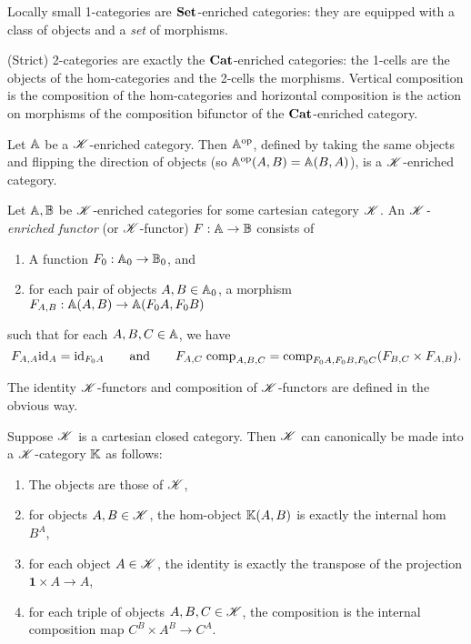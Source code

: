 \documentclass[../thesis.tex]{subfiles}
\begin{document}
\begin{example}
  Locally small 1-categories are ${\mathbf{Set}}$-enriched categories: they are equipped with a class of objects and a \emph{set} of
  morphisms.
\end{example}

\begin{example}[2-categories]\label{ex:2-cat}
  (Strict) 2-categories are exactly the ${\mathbf{Cat}}$-enriched categories: the 1-cells are the objects of the hom-categories and
  the 2-cells the morphisms. Vertical composition is the composition of the hom-categories and horizontal composition is
  the action on morphisms of the composition bifunctor of the ${\mathbf{Cat}}$-enriched category.
\end{example}

\begin{example}
  Let ${\mathbb{A}}$ be a ${\mathscr{K}}$-enriched category. Then ${\mathbb{A}}^{\mathrm{op}}$, defined by taking the same objects and flipping the direction
  of objects (so ${\mathbb{A}}^{\mathrm{op}}(A,B) = {\mathbb{A}}(B,A)$), is a ${\mathscr{K}}$-enriched category.
\end{example}

\begin{definition}\label{def:enriched functor}
  Let ${\mathbb{A}}, {\mathbb{B}}$ be ${\mathscr{K}}$-enriched categories for some cartesian category ${\mathscr{K}}$. An \emph{${\mathscr{K}}$-enriched functor}
  (or ${\mathscr{K}}$-functor) $F : {\mathbb{A}} \to {\mathbb{B}}$ consists of
  \begin{enumerate}
    \item A function $F_0 : {\mathbb{A}}_0 \to {\mathbb{B}}_0$, and
    \item for each pair of objects $A,B \in {\mathbb{A}}_0$, a morphism $F_{A,B} : {\mathbb{A}}(A,B) \to {\mathbb{A}}(F_0 A, F_0 B)$
  \end{enumerate}
  such that for each $A,B,C \in {\mathbb{A}}$, we have
  \[F_{A,A} {\mathrm{id}}_A = {\mathrm{id}}_{F_0 A} \qquad\text{and}\qquad
  F_{A,C}\;{\mathrm{comp}}_{A,B,C} = {\mathrm{comp}}_{F_0A,F_0B,F_0C} (F_{B,C} \times F_{A,B}).\]

  The identity ${\mathscr{K}}$-functors and composition of ${\mathscr{K}}$-functors are defined in the obvious way.
\end{definition}

\begin{example}\label{ex:self enrichment}
  Suppose ${\mathscr{K}}$ is a cartesian closed category. Then ${\mathscr{K}}$ can canonically be made into a ${\mathscr{K}}$-category ${\mathbb{K}}$ as follows:
  \begin{enumerate}
    \item The objects are those of ${\mathscr{K}}$,
    \item for objects $A,B \in {\mathscr{K}}$, the hom-object ${\mathbb{K}}(A,B)$ is exactly the internal hom $B^A$,
    \item for each object $A \in {\mathscr{K}}$, the identity is exactly the transpose of the projection $\mathbf{1} \times A \to A$,
    \item for each triple of objects $A,B,C \in {\mathscr{K}}$, the composition is the internal composition map $C^B \times A^B \to C^A$.
  \end{enumerate}
\end{example}
\end{document}
